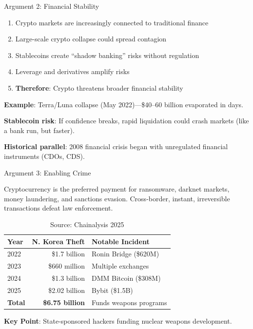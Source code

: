 ﻿\documentclass[aspectratio=169,11pt]{beamer}
\begin{document}
\begin{frame}{Argument 2: Financial Stability}
\begin{argumentbox}
\begin{enumerate}
    \item Crypto markets are increasingly connected to traditional finance
    \item Large-scale crypto collapse could spread contagion
    \item Stablecoins create ``shadow banking'' risks without regulation
    \item Leverage and derivatives amplify risks
    \item \textbf{Therefore}: Crypto threatens broader financial stability
\end{enumerate}
\end{argumentbox}

\vspace{0.3em}
\textbf{Example}: Terra/Luna collapse (May 2022)---\$40--60 billion evaporated in days.

\textbf{Stablecoin risk}: If confidence breaks, rapid liquidation could crash markets (like a bank run, but faster).

\textbf{Historical parallel}: 2008 financial crisis began with unregulated financial instruments (CDOs, CDS).
\end{frame}

\begin{frame}{Argument 3: Enabling Crime}
\begin{argumentbox}
Cryptocurrency is the preferred payment for ransomware, darknet markets, money laundering, and sanctions evasion. Cross-border, instant, irreversible transactions defeat law enforcement.
\end{argumentbox}

\vspace{-0.2em}
\begin{table}[h]
\centering
\scriptsize
\begin{tabular}{@{}lrl@{}}
\toprule
\textbf{Year} & \textbf{N. Korea Theft} & \textbf{Notable Incident} \\
\midrule
2022 & \$1.7 billion & Ronin Bridge (\$620M) \\
2023 & \$660 million & Multiple exchanges \\
2024 & \$1.3 billion & DMM Bitcoin (\$308M) \\
2025 & \$2.02 billion & Bybit (\$1.5B) \\
\midrule
\textbf{Total} & \textbf{\$6.75 billion} & Funds weapons programs \\
\bottomrule
\end{tabular}
\caption*{\scriptsize Source: Chainalysis 2025}
\end{table}
\vspace{-0.5em}
{\small \textbf{Key Point}: State-sponsored hackers funding nuclear weapons development.}
\end{frame}
\end{document}
